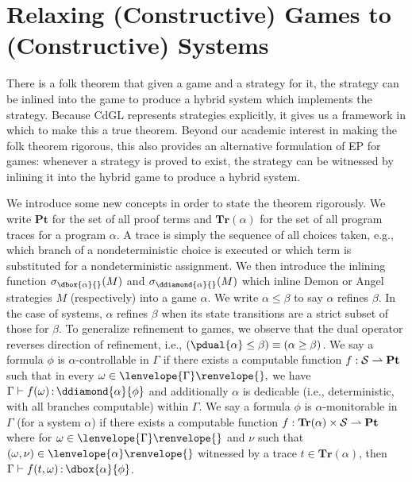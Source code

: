 \documentclass[12pt]{cmuthesis}
\theoremstyle{definition}
\theoremstyle{remark}
\newcommand{\allstate}{\mathcal{S}}
\newcommand{\CdGL}{\textsf{CdGL}\xspace}
\newcommand{\fint}[1]{\lenvelope{#1}\renvelope}
\newcommand{\pint}[1]{\lenvelope{#1}\renvelope} %
\begin{document}
\section{Relaxing (Constructive) Games to (Constructive) Systems}
There is a folk theorem that given a game and a strategy for it, the strategy can be inlined into the game to produce a hybrid system which implements the strategy.
Because \CdGL represents strategies explicitly, it gives us a framework in which to make this a true theorem.
Beyond our academic interest in making the folk theorem rigorous, this also provides an alternative formulation of EP for games: whenever a strategy is proved to exist, the strategy can be witnessed by inlining it into the hybrid game to produce a hybrid system.

\newcommand{\allpt}{\mathbf{Pt}}
\newcommand{\alltrace}[1]{\mathbf{Tr}(#1)}
\newcommand{\dinline}[2]{\sigma_{\dbox{#1}{}}{(#2)}}
\newcommand{\ainline}[2]{\sigma_{\ddiamond{#1}{}}{(#2)}}
We introduce some new concepts in order to state the theorem rigorously.
We write $\allpt$ for the set of all proof terms and $\alltrace{\alpha}$ for the set of all program traces for a program $\alpha$.
A trace is simply the sequence of all choices taken, e.g., which branch of a nondeterministic choice is executed or which term is substituted for a nondeterministic assignment.
We then introduce the inlining function $\dinline{\alpha}{M}$ and $\ainline{\alpha}{M}$ which inline Demon or Angel strategies $M$ (respectively) into a game $\alpha$.
We write $\alpha \leq \beta$ to say $\alpha$ refines $\beta$.
In the case of systems, $\alpha$ refines $\beta$ when its state transitions are a strict subset of those for $\beta$.
To generalize refinement to games, we observe that the dual operator reverses direction of refinement, i.e., $(\pdual{\alpha} \leq \beta) \equiv (\alpha \geq \beta)$.
We say a formula $\phi$ is $\alpha$-controllable in $\Gamma$ if there exists a computable function $f:\allstate\mto\allpt$ such that in every $\omega \in \fint{\Gamma}{},$ we have $\proves{\Gamma}{f(\omega)}{\ddiamond{\alpha}{\phi}}$ and additionally $\alpha$ is dedicable (i.e., deterministic, with all branches computable) within $\Gamma$.
We say a formula $\phi$ is $\alpha$-monitorable in $\Gamma$ (for a system $\alpha$) if there exists a computable function $f:\alltrace{\alpha} \times \allstate \mto \allpt$ where for $\omega \in \fint{\Gamma}{}$ and $\nu$ such that $(\omega,\nu)\in\pint{\alpha}{}$ witnessed by a trace $t \in \alltrace{\alpha}$, then $\proves{\Gamma}{f(t,\omega)}{\dbox{\alpha}{\phi}}$.
\end{document}
